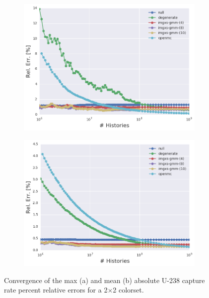 \clearpage

\begin{figure}[h!]
\centering
\begin{subfigure}{\textwidth}
  \centering
  \includegraphics[width=0.9\linewidth]{figures/results/convergence/2x2/max-capt-err-evo}
  \caption{}
  \label{fig:chap11-2x2-capture-converge-max}
\end{subfigure}
\begin{subfigure}{\textwidth}
  \centering
  \includegraphics[width=0.9\linewidth]{figures/results/convergence/2x2/mean-capt-err-evo}
  \caption{}
  \label{fig:chap11-2x2-capture-converge-mean}
\end{subfigure}
\vspace{2mm}
\caption[Fission rate covergence for a 2$\times$2 colorset]{Convergence of the max (a) and mean (b) absolute U-238 capture rate percent relative errors for a 2$\times$2 colorset.}
\label{fig:chap11-2x2-capture-converge}
\end{figure}

